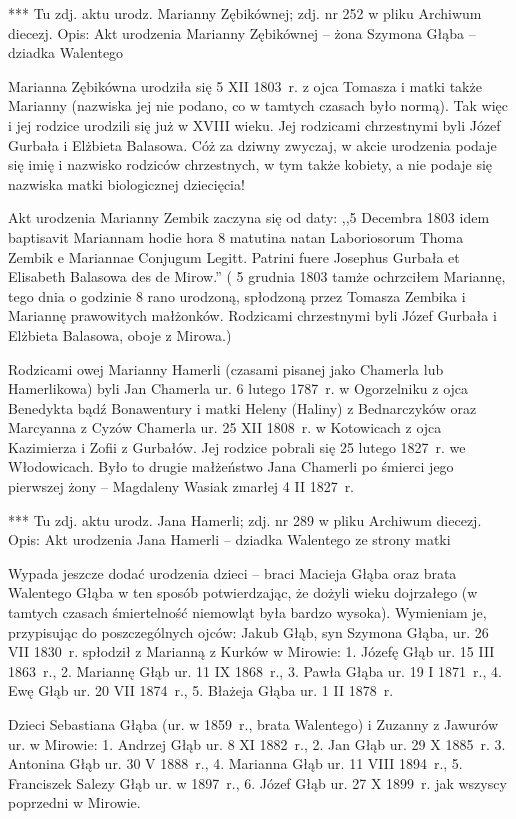{\color{red}
*** Tu zdj. aktu urodz. Marianny Zębikównej; zdj. nr 252 w pliku Archiwum diecezj.
Opis: Akt urodzenia Marianny Zębikównej -- żona Szymona Głąba -- dziadka Walentego }

Marianna Zębikówna urodziła się 5 XII 1803~r. z ojca Tomasza i matki także Marianny (nazwiska jej nie podano, co w tamtych czasach było normą). Tak więc i jej rodzice urodzili się już w XVIII wieku. Jej rodzicami chrzestnymi byli Józef Gurbała i Elżbieta Balasowa. Cóż za dziwny zwyczaj, w akcie urodzenia podaje się imię i nazwisko rodziców chrzestnych, w tym także kobiety, a nie podaje się nazwiska matki biologicznej dziecięcia!

Akt urodzenia Marianny Zembik zaczyna się od daty: ,,5 Decembra 1803 idem baptisavit Mariannam hodie hora 8 matutina natan Laboriosorum Thoma Zembik e Mariannae Conjugum Legitt. Patrini fuere Josephus Gurbała et Elisabeth Balasowa des de Mirow.'' ( 5 grudnia 1803 tamże ochrzciłem Mariannę, tego dnia o godzinie 8 rano urodzoną, spłodzoną przez Tomasza Zembika i Mariannę prawowitych małżonków. Rodzicami chrzestnymi byli Józef Gurbała i Elżbieta Balasowa, oboje z Mirowa.)

Rodzicami owej Marianny Hamerli (czasami pisanej jako Chamerla lub Hamerlikowa) byli Jan Chamerla ur. 6 lutego 1787~r. w Ogorzelniku z ojca Benedykta bądź Bonawentury i matki Heleny (Haliny) z Bednarczyków oraz Marcyanna z Cyzów Chamerla ur. 25 XII 1808~r. w Kotowicach z ojca Kazimierza i Zofii z Gurbałów. Jej rodzice pobrali się 25 lutego 1827~r. we Włodowicach. Było to drugie małżeństwo Jana Chamerli po śmierci jego pierwszej żony -- Magdaleny Wasiak zmarłej 4 II 1827~r.

{\color{red}
*** Tu zdj. aktu urodz. Jana Hamerli; zdj. nr 289 w pliku Archiwum diecezj.
Opis: Akt urodzenia Jana Hamerli -- dziadka Walentego ze strony matki }

Wypada jeszcze dodać urodzenia dzieci -- braci Macieja Głąba oraz brata Walentego Głąba w ten sposób potwierdzając, że dożyli wieku dojrzałego (w tamtych czasach śmiertelność niemowląt była bardzo wysoka). Wymieniam je, przypisując do poszczególnych ojców: Jakub Głąb, syn Szymona Głąba, ur. 26 VII 1830~r. spłodził z Marianną z Kurków w Mirowie: 1. Józefę Głąb ur. 15 III 1863~r., 2. Mariannę Głąb ur. 11 IX 1868~r., 3. Pawła Głąba ur. 19 I 1871~r., 4. Ewę Głąb ur. 20 VII 1874~r., 5. Błażeja Głąba ur. 1 II 1878~r.

Dzieci Sebastiana Głąba (ur. w 1859~r., brata Walentego) i Zuzanny z Jawurów ur. w Mirowie: 1. Andrzej Głąb ur. 8 XI 1882~r., 2. Jan Głąb ur. 29 X 1885~r. 3. Antonina Głąb ur. 30 V 1888~r., 4. Marianna Głąb ur. 11 VIII 1894~r., 5. Franciszek Salezy Głąb ur. w 1897~r., 6. Józef Głąb ur. 27 X 1899~r. jak wszyscy poprzedni w Mirowie.


